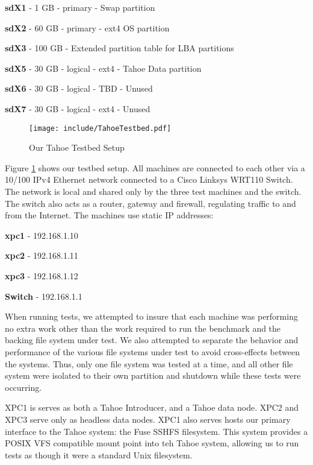 \documentclass[11pt]{article}
\newenvironment{packed_item}{
\begin{itemize}
  \setlength{\itemsep}{1pt}
  \setlength{\parskip}{0pt}
  \setlength{\parsep}{0pt}
}{\end{itemize}}
\begin{document}
\begin{packed_item}
\item {\bf sdX1} - 1 GB - primary - Swap partition
\item {\bf sdX2} - 60 GB - primary - ext4 OS partition
\item {\bf sdX3} - 100 GB - Extended partition table for LBA partitions
\item {\bf sdX5} - 30 GB - logical - ext4 - Tahoe Data partition
\item {\bf sdX6} - 30 GB - logical - TBD - Unused
\item {\bf sdX7} - 30 GB - logical - ext4 - Unused
\end{packed_item}

\begin{figure}[htbp]
  \centering
  \texttt{[image: include/TahoeTestbed.pdf]}
  \caption{Our Tahoe Testbed Setup}
  \label{fig:TahoeTestbed}
\end{figure}

Figure \ref{fig:TahoeTestbed} shows our testbed setup.
All machines are connected to
each other via a 10/100 IPv4 Ethernet network connected to a
Cisco Linksys WRT110 Switch. The network is local and shared only by
the three test machines and the switch. The switch also acts as a
router, gateway and firewall, regulating traffic to and from the Internet.
The machines use static IP addresses:

\begin{packed_item}
\item {\bf xpc1} - 192.168.1.10
\item {\bf xpc2} - 192.168.1.11
\item {\bf xpc3} - 192.168.1.12
\item {\bf Switch} - 192.168.1.1
\end{packed_item}

When running tests, we attempted to insure that each machine was
performing no extra work other than the work required to run the
benchmark and the backing file system under test. We also attempted to
separate the behavior and performance of the various file systems
under test to avoid cross-effects between the systems. Thus, only one
file system was tested at a time, and all other file system were
isolated to their own partition and shutdown while these tests were
occurring. 

XPC1 is serves as both a Tahoe Introducer, and a Tahoe data node. XPC2
and XPC3 serve only as headless data nodes. XPC1 also serves hosts our
primary interface to the Tahoe system: the Fuse SSHFS filesystem. This
system provides a POSIX VFS compatible mount point into teh Tahoe
system, allowing us to run tests as though it were a standard Unix
filesystem.
\end{document}
